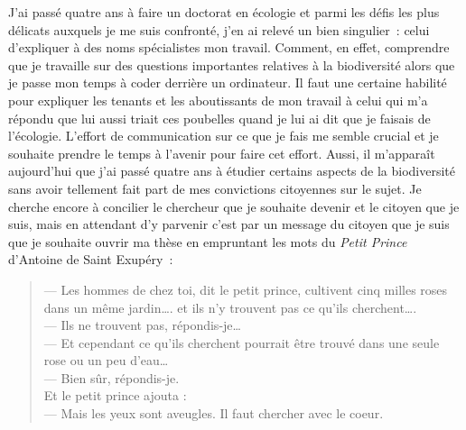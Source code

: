 J'ai passé quatre ans à faire un doctorat en écologie et parmi les défis
les plus délicats auxquels je me suis confronté, j'en ai relevé un bien
singulier~: celui d'expliquer à des noms spécialistes mon travail.
Comment, en effet, comprendre que je travaille sur des questions
importantes relatives à la biodiversité alors que je passe mon temps à
coder derrière un ordinateur. Il faut une certaine habilité pour
expliquer les tenants et les aboutissants de mon travail à celui qui m'a
répondu que lui aussi triait ces poubelles quand je lui ai dit que je
faisais de l'écologie. L'effort de communication sur ce que je fais me
semble crucial et je souhaite prendre le temps à l'avenir pour faire cet
effort. Aussi, il m'apparaît aujourd'hui que j'ai passé quatre ans à
étudier certains aspects de la biodiversité sans avoir tellement fait
part de mes convictions citoyennes sur le sujet. Je cherche encore à
concilier le chercheur que je souhaite devenir et le citoyen que je
suis, mais en attendant d'y parvenir c'est par un message du citoyen que
je suis que je souhaite ouvrir ma thèse en empruntant les mots du
\textit{Petit Prince} d'Antoine de Saint Exupéry~:

\begin{quote}
--- Les hommes de chez toi, dit le petit prince, cultivent cinq milles
roses dans un même jardin\ldots{}. et ils n'y trouvent pas ce qu'ils
cherchent\ldots{}.\\
--- Ils ne trouvent pas, répondis-je\ldots{}\\
--- Et cependant ce qu'ils cherchent pourrait être trouvé dans une seule
rose ou un peu d'eau\ldots{}\\
--- Bien sûr, répondis-je.\\
Et le petit prince ajouta :\\
--- Mais les yeux sont aveugles. Il faut chercher avec le coeur.
\end{quote}
